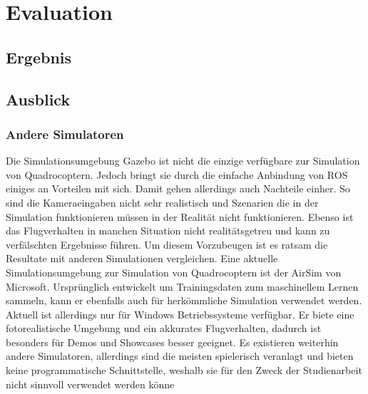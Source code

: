 \chapter{Evaluation}
\section{Ergebnis}


\section{Ausblick}
\subsection{Andere Simulatoren}
Die Simulationsumgebung Gazebo ist nicht die einzige verfügbare zur Simulation von Quadrocoptern. Jedoch bringt sie durch die einfache Anbindung von ROS einiges an Vorteilen mit sich. Damit gehen allerdings auch Nachteile einher. So sind die Kameraeingaben nicht sehr realistisch und Szenarien die in der Simulation funktionieren müssen in der Realität nicht funktionieren. Ebenso ist das Flugverhalten in manchen Situation nicht realitätsgetreu und kann zu verfälschten Ergebnisse führen. Um diesem Vorzubeugen ist es ratsam die Resultate mit anderen Simulationen vergleichen. Eine aktuelle Simulationsumgebung zur Simulation von Quadrocoptern ist der AirSim von Microsoft.\cite{airsim} Ursprünglich entwickelt um Trainingsdaten zum maschinellem Lernen sammeln, kann er ebenfalls auch für herkömmliche Simulation verwendet werden. Aktuell ist allerdings nur für Windows Betriebssysteme verfügbar. \cite{airsimpaper} Er biete eine fotorealistische Umgebung und ein akkurates Flugverhalten, dadurch ist besonders für Demos und Showcases besser geeignet. \newline
Es existieren weiterhin andere Simulatoren, allerdings sind die meisten spielerisch veranlagt und bieten keine programmatische Schnittstelle, weshalb sie für den Zweck der Studienarbeit nicht sinnvoll verwendet werden könne
